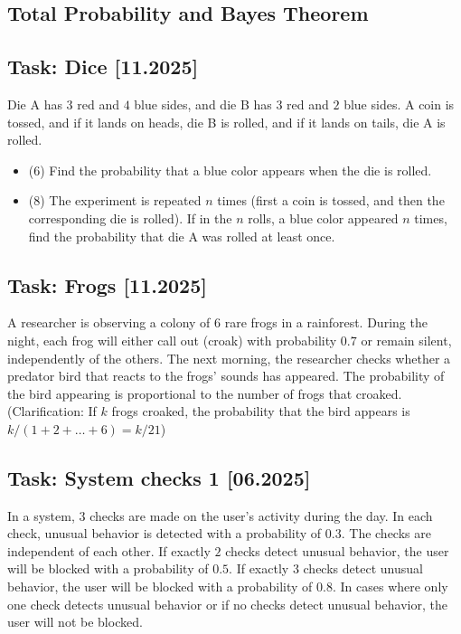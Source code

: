 \documentclass[a4paper, 12pt]{article}
\begin{document}
\subsection*{Total Probability and Bayes Theorem}

\subsection*{Task: Dice [11.2025]}

Die A has $3$ red and $4$ blue sides, and die B has $3$ red and $2$ blue sides. A coin is tossed, and if it lands on heads, die B is rolled, and if it lands on tails, die A is rolled.

\begin{itemize}
    \item [a)](6) Find the probability that a blue color appears when the die is rolled.
    \item [b)](8) The experiment is repeated $n$ times (first a coin is tossed, and then the corresponding die is rolled). If in the $n$ rolls, a blue color appeared $n$ times, find the probability that die A was rolled at least once.

\end{itemize}

\subsection*{Task: Frogs [11.2025]}

A researcher is observing a colony of $6$ rare frogs in a rainforest. During the night, each frog will either call out (croak) with probability $0.7$ or remain silent, independently of the others.
The next morning, the researcher checks whether a predator bird that reacts to the frogs' sounds has appeared. The probability of the bird appearing is proportional to the number of frogs that croaked. (Clarification: If $k$ frogs croaked, the probability that the bird appears is $k/(1+2+ \dots +6) = k/21$)



\subsection*{Task: System checks 1 [06.2025]}

In a system, $3$ checks are made on the user's activity during the day. In each check, unusual behavior is detected with a probability of $0.3$. The checks are independent of each other. If exactly $2$ checks detect unusual behavior, the user will be blocked with a probability of $0.5$. If exactly $3$ checks detect unusual behavior, the user will be blocked with a probability of $0.8$. In cases where only one check detects unusual behavior or if no checks detect unusual behavior, the user will not be blocked.
\end{document}
